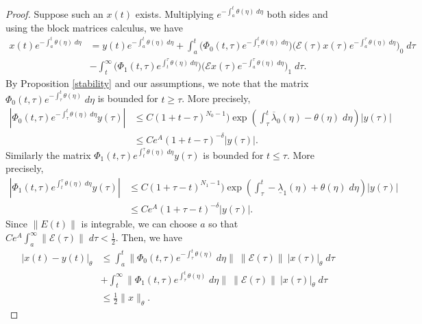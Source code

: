 \documentclass[a4paper,11pt]{article}
\newcommand{\upl}{\overline{\lambda}}
\newcommand{\udl}{\underline{\lambda}}
\newcommand{\E}{\mathcal{E}}
\theoremstyle{remark}
\begin{document}
\begin{proof}
 Suppose such an $x(t)$ exists. Multiplying $e^{-\int_a^t \theta(\eta) \;d\eta}$ both sides and using the block matrices calculus, we have
 \begin{equation} \label{eq:integral2}
 \begin{aligned}
  x(t)e^{-\int_a^t \theta(\eta) \;d\eta} &= y(t)e^{-\int_a^t \theta(\eta) \;d\eta} + \int_a^t \big(\Phi_0(t,\tau)e^{-\int_\tau^t \theta(\eta) \;d\eta}\big)\big(\E(\tau) x(\tau)e^{-\int_a^\tau \theta(\eta) \;d\eta}\big)_0 \;d\tau \\
  &- \int_t^\infty \big(\Phi_1(t,\tau)e^{\int_t^\tau \theta(\eta) \;d\eta}\big) \big(\E x(\tau)e^{-\int_a^\tau \theta(\eta) \;d\eta}\big)_1 \; d\tau.
 \end{aligned}
 \end{equation}
By Proposition \ref{stability} and our assumptions, we note that   the matrix $\Phi_0(t,\tau)e^{-\int_\tau^t \theta(\eta)}\;d\eta$  is bounded for $t\ge \tau$. More precisely,
\begin{align}
 \left|\Phi_0(t,\tau)e^{-\int_\tau^t \theta(\eta) \;d\eta}y(\tau)\right| &\le C(1 + t-\tau)^{N_0-1})\exp\left(\int_\tau^t \upl_0(\eta)-\theta(\eta) \;d\eta\right)|y(\tau)| \nonumber\\
 &\le Ce^A(1 + t-\tau)^{-\delta}|y(\tau)|. \label{eq:decay0}
\end{align}
Similarly the matrix $\Phi_1(t,\tau)e^{\int_t^\tau \theta(\eta)\;d\eta}y(\tau)$ is bounded for $t\le \tau$. More precisely,
\begin{align*}
 \left|\Phi_1(t,\tau)e^{\int_t^\tau \theta(\eta)\;d\eta}y(\tau)\right| &\le C(1 + \tau- t)^{N_1-1})\exp\left(\int_\tau^t -\udl_1(\eta)+\theta(\eta) \; d\eta\right)|y(\tau)| \nonumber\\
 &\le Ce^A(1 + \tau-t)^{-\delta}|y(\tau)|. %
\end{align*}
Since $\|E(t)\|$ is integrable, we can choose $a$ so that $Ce^A\int_a^\infty \|\E(\tau)\| \;d\tau < \frac{1}{2}$. Then, we have
\begin{align*}
|x(t)-y(t)|_{\theta} &\le \int_a^t \|\Phi_0(t,\tau)e^{-\int_\tau^t \theta(\eta)}\;d\eta\| \:\|\E(\tau)\| \: |x(\tau)|_\theta \; d\tau \\
&+ \int_t^\infty \|\Phi_1(t,\tau)e^{\int_\tau^t \theta(\eta)}\;d\eta\| \: \|\E(\tau)\| \:|x(\tau)|_\theta \; d\tau\\
&\le \frac{1}{2}\|x\|_{\theta}.
\end{align*}


\end{proof}
\end{document}
